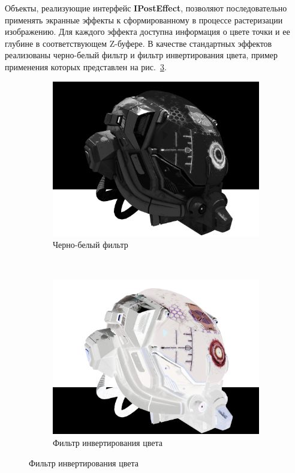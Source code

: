 \documentclass[14pt]{matmex-diploma}
\begin{document}
Объекты, реализующие интерфейс \textbf{IPostEffect}, позволяют последовательно применять экранные эффекты к сформированному в процессе растеризации изображению. Для каждого эффекта доступна информация о цвете точки и ее глубине в соответствующем Z-буфере. В качестве стандартных эффектов реализованы черно-белый фильтр и фильтр инвертирования цвета, пример применения которых представлен на рис.~\ref{fig:effects}. 

\begin{figure}[]
     \caption{Применение экранных эффектов к растеризованному изображению}
     \centering
     \begin{subfigure}[b]{0.44\textwidth}
        \includegraphics[width=\textwidth]{pictures/Noir}
        \caption{Черно-белый фильтр}
        \label{fig:effects:white:black}
    \end{subfigure}
    ~
    \begin{subfigure}[b]{0.44\textwidth}
        \includegraphics[width=\textwidth]{pictures/Inverse}
        \caption{Фильтр инвертирования цвета}
        \label{fig:effects:inverse}
    \end{subfigure}
    
    \label{fig:effects}
\end{figure}
\end{document}
